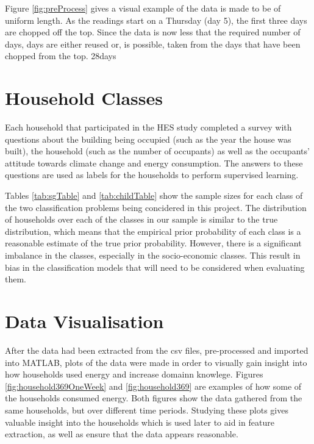 Figure \ref{fig:preProcess} gives a visual example of the data is made to be of uniform length. As the readings start on a Thursday (day 5), the first three days are chopped off the top. Since the data is now less that the required number of days, days are either reused or, is possible, taken from the days that have been chopped from the top.
\to28days

\section{Household Classes}

Each household that participated in the HES study completed a survey with questions about the building being occupied (such as the year the house was built), the household (such as the number of occupants) as well as the occupants' attitude towards climate change and energy consumption. The answers to these questions are used as labels for the households to perform supervised learning.

\sgTable

Tables \ref{tab:sgTable} and \ref{tab:childTable} show the sample sizes for each class of the two classification problems being concidered in this project. The distribution of households over each of the classes in our sample is similar to the true distribution, which means that the empirical prior probability of each class is a reasonable estimate of the true prior probability. However, there is a significant imbalance in the classes, especially in the socio-economic classes. This result in bias in the classification models that will need to be considered when evaluating them.
\childTable

\section{Data Visualisation}

After the data had been extracted from the csv files, pre-processed and imported into MATLAB, plots of the data were made in order to visually gain insight into how households used energy and increase domainn knowlege. Figures \ref{fig:household369OneWeek} and \ref{fig:household369} are examples of how some of the households consumed energy. Both figures show the data gathered from the same households, but over different time periods. Studying these plots gives valuable insight into the households which is used later to aid in feature extraction, as well as ensure that the data appears reasonable. 


